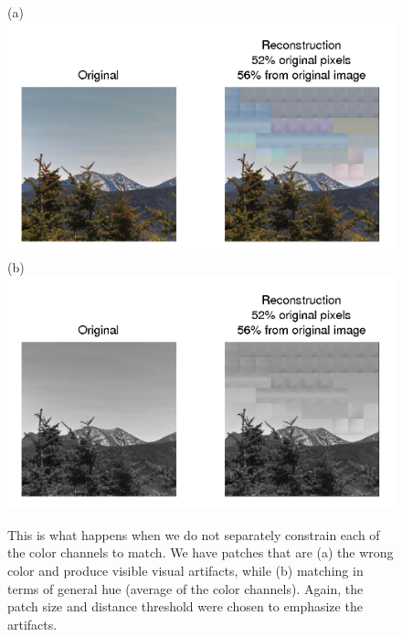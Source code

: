 
 \begin{figure}
\centering
(a)\includegraphics[width=0.7\linewidth]{Figures/197.png}
(b)\includegraphics[width=0.7\linewidth]{Figures/197_bw.png}
\caption{This is what happens when we do not separately constrain each of the color channels to match. We have patches that are (a) the wrong color and produce visible visual artifacts, while (b) matching in terms of general hue (average of the color channels). Again, the patch size and distance threshold were chosen to emphasize the artifacts.}
\label{fig:colProblem}
\end{figure}

